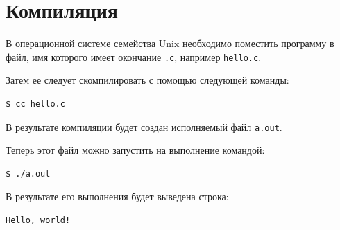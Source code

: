 \section{Компиляция}

В операционной системе семейства Unix необходимо поместить программу в файл,
имя которого имеет окончание \texttt{.c}, например \texttt{hello.c}.

Затем ее следует скомпилировать с помощью следующей команды:

\begin{verbatim}
$ cc hello.c
\end{verbatim}

В результате компиляции будет создан исполняемый файл \texttt{a.out}.

Теперь этот файл можно запустить на выполнение командой:

\begin{verbatim}
$ ./a.out
\end{verbatim}

В результате его выполнения будет выведена строка:

\begin{verbatim}
Hello, world!
\end{verbatim}
